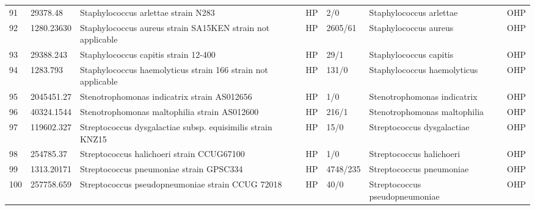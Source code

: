 \begin{longtable}{llllllll}
91  &      29378.48 &                                      Staphylococcus arlettae strain N283 &    HP &       2/0 &                        Staphylococcus arlettae &                            \cite{lavecchia2019staphylococcus} &   OHP \\
92  &    1280.23630 &               Staphylococcus aureus strain SA15KEN strain not applicable &    HP &   2605/61 &                          Staphylococcus aureus &                      \cite{tong2015staphylococcus,1280.23630} &   OHP \\
93  &     29388.243 &                                     Staphylococcus capitis strain 12-400 &    HP &      29/1 &                         Staphylococcus capitis &                                    \cite{cameron2015insights} &   OHP \\
94  &      1283.793 &             Staphylococcus haemolyticus strain 166 strain not applicable &    HP &     131/0 &                    Staphylococcus haemolyticus &                                \cite{cavanagh2019comparative} &   OHP \\
95  &    2045451.27 &                              Stenotrophomonas indicatrix strain AS012656 &    HP &       1/0 &                    Stenotrophomonas indicatrix &                   \cite{2045451.27,weber2018stenotrophomonas} &   OHP \\
96  &    40324.1544 &                             Stenotrophomonas maltophilia strain AS012600 &    HP &     216/1 &                   Stenotrophomonas maltophilia &                                      \cite{kalidasan2018iron} &   OHP \\
97  &    119602.327 &               Streptococcus dysgalactiae subsp. equisimilis strain KNZ15 &    HP &      15/0 &                     Streptococcus dysgalactiae &                                \cite{matsue2020pathogenicity} &   OHP \\
98  &     254785.37 &                                Streptococcus halichoeri strain CCUG67100 &    HP &       1/0 &                       Streptococcus halichoeri &                              \cite{aaltonen2020streptococcus} &   OHP \\
99  &    1313.20171 &                                  Streptococcus pneumoniae strain GPSC334 &    HP &  4748/235 &                       Streptococcus pneumoniae &             \cite{lo2019pneumococcal,weiser2018streptococcus} &   OHP \\
100 &    257758.659 &                         Streptococcus pseudopneumoniae strain CCUG 72018 &    HP &      40/0 &                 Streptococcus pseudopneumoniae &                                  \cite{gonzales2020pangenome} &   OHP \\

\end{longtable}
